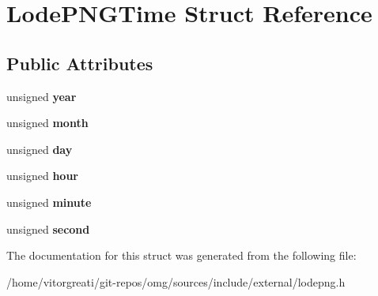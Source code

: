 \hypertarget{struct_lode_p_n_g_time}{}\section{Lode\+P\+N\+G\+Time Struct Reference}
\label{struct_lode_p_n_g_time}
\subsection*{Public Attributes}
\begin{DoxyCompactItemize}
\item 
\mbox{\label{struct_lode_p_n_g_time_a32b68342f39f3d38ba91a721b1149b8f}} 
unsigned {\bfseries year}
\item 
\mbox{\label{struct_lode_p_n_g_time_a295d890e862d5cd0c444e9d3a96fa9d5}} 
unsigned {\bfseries month}
\item 
\mbox{\label{struct_lode_p_n_g_time_aa3dee3b7b3a1e730fbded7a7b8cf355e}} 
unsigned {\bfseries day}
\item 
\mbox{\label{struct_lode_p_n_g_time_ac99cb7f3ce16a85f9f505b7f5f6e0aa7}} 
unsigned {\bfseries hour}
\item 
\mbox{\label{struct_lode_p_n_g_time_ac3045de79728f29fc61f534b062e0f13}} 
unsigned {\bfseries minute}
\item 
\mbox{\label{struct_lode_p_n_g_time_a6c691c5821e828488a8bb8a90751a2f0}} 
unsigned {\bfseries second}
\end{DoxyCompactItemize}


The documentation for this struct was generated from the following file\+:\begin{DoxyCompactItemize}
\item 
/home/vitorgreati/git-\/repos/omg/sources/include/external/lodepng.\+h\end{DoxyCompactItemize}
